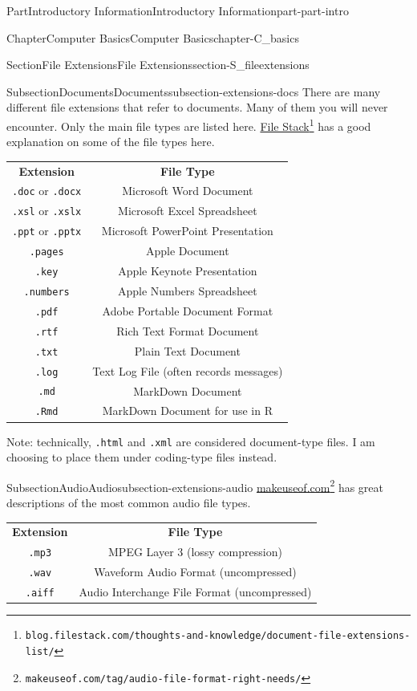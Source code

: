\documentclass[oneside,10pt,]{book}
\newcommand{\tabularfont}{\relax}
\newcommand{\mono}[1]{\texttt{#1}}
\begin{document}
\begin{partptx}{Part}{Introductory Information}{}{Introductory Information}{}{}{part-part-intro}
\begin{chapterptx}{Chapter}{Computer Basics}{}{Computer Basics}{}{}{chapter-C_basics}
\begin{sectionptx}{Section}{File Extensions}{}{File Extensions}{}{}{section-S_fileextensions}
\begin{subsectionptx}{Subsection}{Documents}{}{Documents}{}{}{subsection-extensions-docs}
There are many different file extensions that refer to documents. Many of them you will never encounter. Only the main file types are listed here. \href{https://blog.filestack.com/thoughts-and-knowledge/document-file-extensions-list/}{File Stack}\footnote{\nolinkurl{blog.filestack.com/thoughts-and-knowledge/document-file-extensions-list/}\label{fn-extensions-docs-c-b}} has a good explanation on some of the file types here.%
\begin{center}%
{\tabularfont%
\begin{tabular}{cc}
{\bfseries{}Extension}&{\bfseries{}File Type}\tabularnewline[0pt]
\mono{.doc} or \mono{.docx}&Microsoft Word Document\tabularnewline[0pt]
\mono{.xsl} or \mono{.xslx}&Microsoft Excel Spreadsheet\tabularnewline[0pt]
\mono{.ppt} or \mono{.pptx}&Microsoft PowerPoint Presentation\tabularnewline[0pt]
\mono{.pages}&Apple Document\tabularnewline[0pt]
\mono{.key}&Apple Keynote Presentation\tabularnewline[0pt]
\mono{.numbers}&Apple Numbers Spreadsheet\tabularnewline[0pt]
\mono{.pdf}&Adobe Portable Document Format\tabularnewline[0pt]
\mono{.rtf}&Rich Text Format Document\tabularnewline[0pt]
\mono{.txt}&Plain Text Document\tabularnewline[0pt]
\mono{.log}&Text Log File (often records messages)\tabularnewline[0pt]
\mono{.md}&MarkDown Document\tabularnewline[0pt]
\mono{.Rmd}&MarkDown Document for use in R
\end{tabular}
}%
\end{center}%
Note: technically, \mono{.html} and \mono{.xml} are considered document-type files. I am choosing to place them under coding-type files instead.%
\end{subsectionptx}
%
%
\typeout{************************************************}
\typeout{************************************************}
%
\begin{subsectionptx}{Subsection}{Audio}{}{Audio}{}{}{subsection-extensions-audio}
%
\href{https://www.makeuseof.com/tag/audio-file-format-right-needs/}{makeuseof.com}\footnote{\nolinkurl{makeuseof.com/tag/audio-file-format-right-needs/}\label{fn-extensions-audio-c-b}} has great descriptions of the most common audio file types.%
\begin{center}%
{\tabularfont%
\begin{tabular}{cc}
{\bfseries{}Extension}&{\bfseries{}File Type}\tabularnewline[0pt]
\mono{.mp3}&MPEG Layer 3 (lossy compression)\tabularnewline[0pt]
\mono{.wav}&Waveform Audio Format (uncompressed)\tabularnewline[0pt]
\mono{.aiff}&Audio Interchange File Format (uncompressed)\tabularnewline[0pt]

\end{tabular}}
\end{center}
\end{subsectionptx}
\end{sectionptx}
\end{chapterptx}
\end{partptx}
\end{document}
